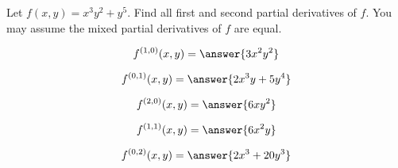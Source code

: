 \documentclass{ximera}
\author{David Guichard \and Neal Koblitz \and H. Jerome Keisler \and Albert Scheller \and Barry Balof \and Mike Wills \and Matthew Carr}
\begin{document}
\begin{exercise}




Let $f(x,y)=x^3y^2+y^5$. Find all first and second partial derivatives of $f$. You may assume the mixed partial derivatives of $f$ are equal.

\begin{prompt}
\[
f^{(1,0)}(x,y)=\answer{3x^2y^2}
\]
\end{prompt}
\begin{prompt}
\[
f^{(0,1)}(x,y)=\answer{2x^3 y+5y^4}
\]
\end{prompt}
\begin{prompt}
\[
f^{(2,0)}(x,y)=\answer{6xy^2}
\]
\end{prompt}
\begin{prompt}
\[
f^{(1,1)}(x,y)=\answer{6x^2y}
\]
\end{prompt}
\begin{prompt}
\[
f^{(0,2)}(x,y)=\answer{2x^3+20y^3}
\]
\end{prompt}

\end{exercise}
\end{document}

